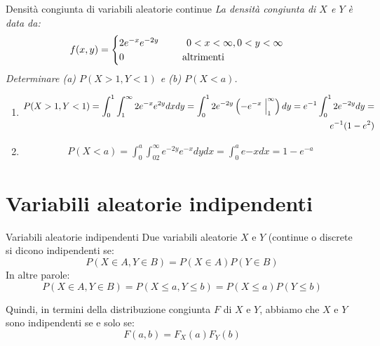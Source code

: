 \begin{Example}{Densità congiunta di variabili aleatorie continue}{}
    \textit{La densità congiunta di $X$ e $Y$ è data da:}
    \begin{equation*}
        f(x,y)=\begin{cases}
            2e^{-x}e^{-2y}\hspace{1cm}0<x<\infty,0<y<\infty\\0\hspace{2.1cm}\mbox{altrimenti}
        \end{cases}
    \end{equation*}
    \textit{Determinare (a) $P(X>1,Y<1)$ e (b) $P(X<a)$.}

    \begin{enumerate}[label=(\alph*)]
        \item 
        \begin{align*}
            P(X>1,Y<1)=\int^1_0\int^\infty_12e^{-x}e^{2y}dxdy=\int^1_02e^{-2y}\left(-e^{-x}\Bigm\lvert^\infty_1\right)dy=e^{-1}\int^1_02e^{-2y}dy=\\e^{-1}(1-e^2)
        \end{align*}

        \item 
        \begin{align*}
            P(X<a)=\int^a_0\int^\infty_02e^{-2y}e^{-x}dydx=\int^a_0e{-x}dx=1-e^{-a}
        \end{align*}
    \end{enumerate}
\end{Example}

\section{Variabili aleatorie indipendenti}

\begin{Definition}{Variabili aleatorie indipendenti}{}
    Due variabili aleatorie $X$ e $Y$ (continue o discrete si dicono indipendenti se:
    \begin{equation*}
        P(X\in A, Y\in B)=P(X\in A)P(Y\in B)
    \end{equation*}
    In altre parole:
    \begin{equation*}
        P(X\in A, Y\in B)=P(X\leq a, Y\leq b)=P(X\leq a)P(Y\leq b)
    \end{equation*}
\end{Definition}

Quindi, in termini della distribuzione congiunta $F$ di $X$ e $Y$, abbiamo che $X$ e $Y$ sono indipendenti se e solo se:
\begin{equation*}
    F(a,b)=F_X(a)F_Y(b)
\end{equation*}

